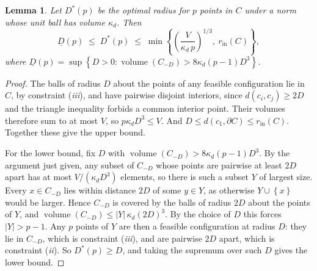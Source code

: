 \documentclass[preprint,12pt]{elsarticle}
\newtheorem{lemma}{Lemma}
\theoremstyle{remark}
\newcommand{\set}[1]{\left\{ #1 \right\}}
\newcommand{\paren}[1]{\left( #1 \right)}
\begin{document}
\begin{lemma}\label{lem:bracket}
  Let $D^*(p)$ be the optimal radius for $p$ points in $C$ under a norm whose
  unit ball has volume $\kappa_d$. Then
  \begin{equation*}
    \underline{D}(p) \;\le\; D^*(p) \;\le\;
    \min \set{\paren{\frac{V}{\kappa_d \, p}}^{1/3},\ r_{\text{in}}(C)},
  \end{equation*}
  where $\underline{D}(p) = \sup \set{D > 0 : \operatorname{volume}(C_{-D}) > 8
  \kappa_d (p - 1) D^3}$.
\end{lemma}

\begin{proof}
  The balls of radius $D$ about the points of any feasible configuration lie in
  $C$, by constraint (\textit{iii}), and have pairwise disjoint interiors, since
  $d(c_i, c_j) \ge 2D$ and the triangle inequality forbids a common interior
  point. Their volumes therefore sum to at most $V$, so $p \kappa_d D^3 \le V$.
  And $D \le d(c_1, \partial C) \le r_{\text{in}}(C)$. Together these give the
  upper bound.

  For the lower bound, fix $D$ with $\operatorname{volume}(C_{-D}) > 8 \kappa_d
  (p - 1) D^3$. By the argument just given, any subset of $C_{-D}$ whose points
  are pairwise at least $2D$ apart has at most $V / (\kappa_d D^3)$ elements, so
  there is such a subset $Y$ of largest size. Every $x \in C_{-D}$ lies within
  distance $2D$ of some $y \in Y$, as otherwise $Y \cup \set{x}$ would be
  larger. Hence $C_{-D}$ is covered by the balls of radius $2D$ about the points
  of $Y$, and $\operatorname{volume}(C_{-D}) \le |Y| \, \kappa_d (2D)^3$. By the
  choice of $D$ this forces $|Y| > p - 1$. Any $p$ points of $Y$ are then a
  feasible configuration at radius $D$: they lie in $C_{-D}$, which is
  constraint (\textit{iii}), and are pairwise $2D$ apart, which is constraint
  (\textit{ii}). So $D^*(p) \ge D$, and taking the supremum over such $D$ gives
  the lower bound.
\end{proof}
\end{document}
